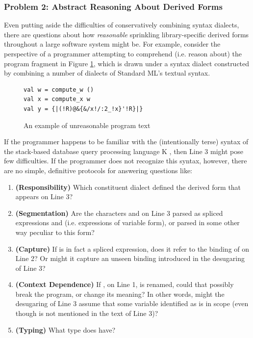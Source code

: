 \subsubsection{Problem 2: Abstract Reasoning About Derived Forms}\label{sec:abs-reasoning-intro}
Even putting aside the difficulties of conservatively combining syntax dialects, there are questions about how \emph{reasonable}  sprinkling library-specific derived forms throughout a large software system might be. 
For example, consider the perspective of a programmer attempting to comprehend (i.e. reason about) the program fragment in Figure \ref{fig:K-dialect}, which is drawn under a syntax dialect constructed by combining a number of dialects of Standard ML's textual syntax.

\begin{figure}[h]
\begin{lstlisting}
val w = compute_w ()
val x = compute_x w
val y = {|(!R)@&{&/x!/:2_!x}'!R}|}
\end{lstlisting}
\caption{An example of unreasonable program text}
\label{fig:K-dialect}
\end{figure}

If the programmer happens to be familiar with the (intentionally terse) syntax of the stack-based database query processing language K \cite{Whitney:2001:LOR:376284.375783}, then Line 3 might pose few difficulties. If the programmer does not recognize this syntax, however, there are no simple, definitive protocols for answering questions like:
\begin{enumerate}
\item \textbf{(Responsibility)} Which constituent dialect defined the derived form that appears on Line 3?
\item \textbf{(Segmentation)} Are the characters  and  on Line 3 parsed as spliced expressions  and  (i.e. expressions of variable form), or parsed in some other way peculiar to this form?
\item \textbf{(Capture)} If  is in fact a spliced expression, does it refer to the binding of  on Line 2? Or might it capture an unseen binding introduced in the desugaring of Line 3?
\item \textbf{(Context Dependence)} If , on Line 1, is renamed, could that possibly break the program, or change its meaning? In other words, might the desugaring of Line 3 assume that some variable identified as  is in scope (even though  is not mentioned in the text of Line 3)?
\item \textbf{(Typing)} What type does  have?
\end{enumerate}

